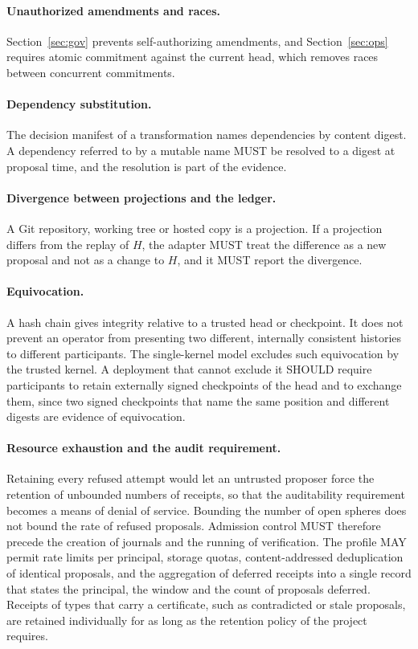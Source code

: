 \documentclass[11pt]{article}
\theoremstyle{remark}
\begin{document}
\paragraph{Unauthorized amendments and races.} Section~\ref{sec:gov} prevents self-authorizing amendments, and Section~\ref{sec:ops} requires atomic commitment against the current head, which removes races between concurrent commitments.

\paragraph{Dependency substitution.} The decision manifest of a transformation names dependencies by content digest. A dependency referred to by a mutable name MUST be resolved to a digest at proposal time, and the resolution is part of the evidence.

\paragraph{Divergence between projections and the ledger.} A Git repository, working tree or hosted copy is a projection. If a projection differs from the replay of $H$, the adapter MUST treat the difference as a new proposal and not as a change to $H$, and it MUST report the divergence.

\paragraph{Equivocation.} A hash chain gives integrity relative to a trusted head or checkpoint. It does not prevent an operator from presenting two different, internally consistent histories to different participants. The single-kernel model excludes such equivocation by the trusted kernel. A deployment that cannot exclude it SHOULD require participants to retain externally signed checkpoints of the head and to exchange them, since two signed checkpoints that name the same position and different digests are evidence of equivocation.

\paragraph{Resource exhaustion and the audit requirement.} Retaining every refused attempt would let an untrusted proposer force the retention of unbounded numbers of receipts, so that the auditability requirement becomes a means of denial of service. Bounding the number of open spheres does not bound the rate of refused proposals. Admission control MUST therefore precede the creation of journals and the running of verification. The profile MAY permit rate limits per principal, storage quotas, content-addressed deduplication of identical proposals, and the aggregation of deferred receipts into a single record that states the principal, the window and the count of proposals deferred. Receipts of types that carry a certificate, such as contradicted or stale proposals, are retained individually for as long as the retention policy of the project requires.
\end{document}
